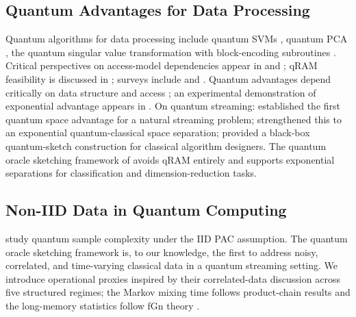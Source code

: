 \documentclass[sensors,article,submit,pdftex,moreauthors]{Definitions/mdpi}
\providecommand{\DIFadd}[1]{{\protect\color{blue}#1}} %
\providecommand{\DIFdel}[1]{} %
\providecommand{\DIFaddbegin}{} %
\providecommand{\DIFaddend}{} %
\providecommand{\DIFdelbegin}{} %
\providecommand{\DIFdelend}{} %
\begin{document}
\subsection{Quantum Advantages for Data Processing}

Quantum algorithms for data processing include quantum SVMs \citep{rebentrost2014quantum}, quantum PCA \citep{lloyd2014quantum}, the quantum singular value transformation \citep{gilyen2019qsvt} with block-encoding subroutines \citep{chakraborty2019blockencodings}. Critical perspectives on access-model dependencies appear in \citet{aaronson2015readthefineprint} and \citet{tang2019quantum}; qRAM feasibility is discussed in \citet{giovannetti2008quantum}; surveys include \citet{chen2024qmlsurvey} and \citet{schuld2018supervised}. Quantum advantages depend critically on data structure and access \citep{huang2021powerofdata}; an experimental demonstration of exponential advantage appears in \citet{huang2022experiments}. On quantum streaming: \citet{kallaugher2021streaming} established the first \DIFdelbegin \DIFdel{exponential quantum-classical space separation }\DIFdelend \DIFaddbegin \DIFadd{quantum space advantage }\DIFaddend for a natural streaming problem; \DIFaddbegin \citet{kallaugher2024maxdicut} \DIFadd{strengthened this to an exponential quantum-classical space separation; }\DIFaddend \citet{kallaugher2025designquantum} provided a black-box quantum-sketch construction for classical algorithm designers. The quantum oracle sketching framework of \citet{zhao2026exponential} avoids qRAM entirely and supports exponential separations for classification and dimension-reduction tasks.

\subsection{Non-IID Data in Quantum Computing}

\citet{arunachalam2018optimal} study quantum sample complexity under the IID PAC assumption. The quantum oracle sketching framework \citep{zhao2026exponential} is, to our knowledge, the first to address noisy, correlated, and time-varying classical data in a quantum streaming setting. We introduce operational proxies inspired by their correlated-data discussion across five structured regimes; the Markov mixing time follows product-chain results \citep{levin2017mixing} and the long-memory statistics follow fGn theory \citep{mandelbrot1968fbm, beran1994statistics}.


\end{document}
